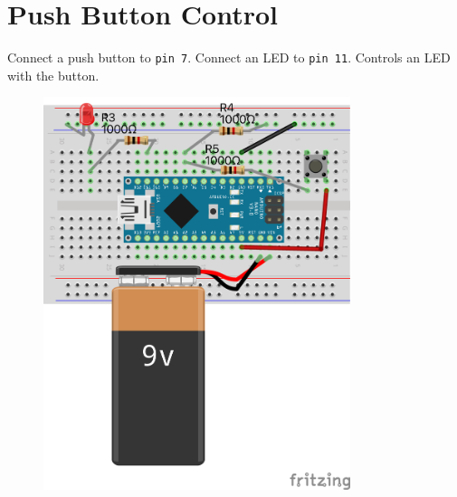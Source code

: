\documentclass{article}
\begin{document}
\section*{Push Button Control}
\begin{minipage}{\textwidth}
Connect a push button to \texttt{pin 7}. Connect an LED to \texttt{pin 11}. Controls an LED with the button.
\end{minipage}
\begin{figure}[h!]
\centering
\includegraphics[width=0.8\textwidth]{button_nano_bb.png}
\end{figure}
\newpage
\end{document}
